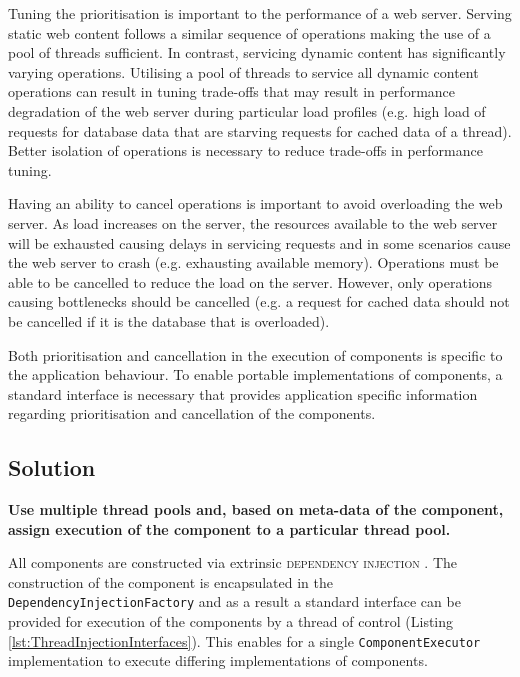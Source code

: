 \documentclass[prodmode]{style/acmlarge}
\begin{document}
Tuning the prioritisation is important to the performance of a web server.
Serving static web content follows a similar sequence of operations making the
use of a pool of threads sufficient.  In contrast, servicing dynamic content has
significantly varying operations.  Utilising a pool of threads to service all
dynamic content operations can result in tuning trade-offs that may result in
performance degradation of the web server during particular load profiles (e.g.
high load of requests for database data that are starving requests for cached
data of a thread).  Better isolation of operations is necessary to reduce
trade-offs in performance tuning.

Having an ability to cancel operations is important to avoid overloading the web
server.  As load increases on the server, the resources available to the web
server will be exhausted causing delays in servicing requests and in some
scenarios cause the web server to crash (e.g. exhausting available memory). 
Operations must be able to be cancelled to reduce the load on the server. 
However, only operations causing bottlenecks should be cancelled (e.g. a request
for cached data should not be cancelled if it is the database that is
overloaded).

Both prioritisation and cancellation in the execution of components is specific
to the application behaviour.  To enable portable implementations of components,
a standard interface is necessary that provides application specific information
regarding prioritisation and cancellation of the components.


\subsection{Solution}

\textbf{Use multiple thread pools and, based on meta-data of the component, assign execution of the component to a particular thread pool.}

All components are constructed via extrinsic \textsc{dependency injection}
\cite{ioc}.  The construction of the component is encapsulated in the
\texttt{DependencyInjectionFactory} and as a result a standard interface can be
provided for execution of the components by a thread of control (Listing
\ref{lst:ThreadInjectionInterfaces}).  This enables for a single
\texttt{ComponentExecutor} implementation to execute differing implementations
of components.
\end{document}
